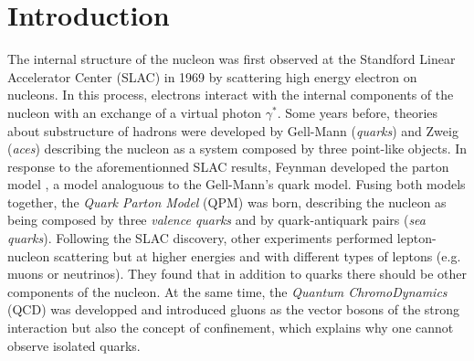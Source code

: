 
\chapter*{Introduction} %

\label{ch:intro} %


The internal structure of the nucleon was first observed at the Standford Linear Accelerator Center (SLAC) in 1969 \cite{SLAC} by scattering high energy electron on nucleons. In this process, electrons interact with the internal components of the nucleon with an exchange of a virtual photon $\gamma^*$. Some years before, theories about substructure of hadrons were developed by Gell-Mann (\textit{quarks}) \cite{Gellman} and Zweig (\textit{aces}) \cite{Zweig} describing the nucleon as a system composed by three point-like objects. In response to the aforementionned SLAC results, Feynman developed the parton model \cite{PartonModel}, a model analoguous to the Gell-Mann's quark model. Fusing both models together, the \textit{Quark Parton Model} (QPM) was born, describing the nucleon as being composed by three \textit{valence quarks} and by quark-antiquark pairs (\textit{sea quarks}). Following the SLAC discovery, other experiments performed lepton-nucleon scattering but at higher energies and with different types of leptons (e.g. muons or neutrinos). They found that in addition to quarks there should be other components of the nucleon. At the same time, the \textit{Quantum ChromoDynamics} (QCD) was developped and introduced gluons as the vector bosons of the strong interaction but also the concept of confinement, which explains why one cannot observe isolated quarks.

